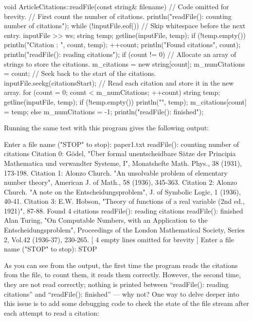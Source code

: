 \begin{cpp}
void ArticleCitations::readFile(const string& filename)
{
    // Code omitted for brevity.
    // First count the number of citations.
    println("readFile(): counting number of citations");
    while (!inputFile.eof()) {
        // Skip whitespace before the next entry.
        inputFile >> ws;
        string temp;
        getline(inputFile, temp);
        if (!temp.empty()) {
            println("Citation {}: {}", count, temp);
            ++count;
        }
        }
        println("Found {} citations", count);
        println("readFile(): reading citations");
        if (count != 0) {
        // Allocate an array of strings to store the citations.
        m_citations = new string[count];
        m_numCitations = count;
        // Seek back to the start of the citations.
        inputFile.seekg(citationsStart);
        // Read each citation and store it in the new array.
        for (count = 0; count < m_numCitations; ++count) {
            string temp;
            getline(inputFile, temp);
            if (!temp.empty()) {
                println("{}", temp);
                m_citations[count] = temp;
            }
        }
    } else {
        m_numCitations = -1;
    }
    println("readFile(): finished");
}
\end{cpp}

Running the same test with this program gives the following output:

\begin{shell}
Enter a file name ("STOP" to stop): paper1.txt
readFile(): counting number of citations
Citation 0: Gödel, "Über formal unentscheidbare Sätze der Principia Mathematica und
verwandter Systeme, I", Monatshefte Math. Phys., 38 (1931), 173-198.
Citation 1: Alonzo Church. "An unsolvable problem of elementary number theory",
American J. of Math., 58 (1936), 345-363.
Citation 2: Alonzo Church. "A note on the Entscheidungsproblem", J. of Symbolic
Logic, 1 (1936), 40-41.
Citation 3: E.W. Hobson, "Theory of functions of a real variable (2nd ed.,
1921)", 87-88.
Found 4 citations
readFile(): reading citations
readFile(): finished
Alan Turing, "On Computable Numbers, with an Application to the
Entscheidungsproblem", Proceedings of the London Mathematical Society, Series 2,
Vol.42 (1936-37), 230-265.
[ 4 empty lines omitted for brevity ]
Enter a file name ("STOP" to stop): STOP
\end{shell}

As you can see from the output, the first time the program reads the citations from the file, to count them, it reads them correctly. However, the second time, they are not read correctly; nothing is printed between “readFile(): reading citations” and “readFile(): finished” — why not? One way to delve deeper into this issue is to add some debugging code to check the state of the file stream after each attempt to read a citation:

